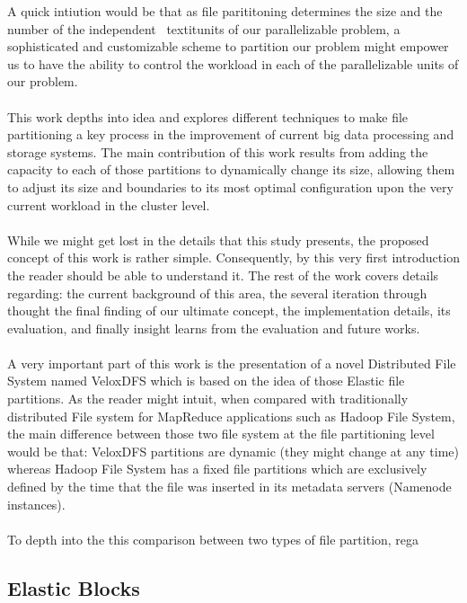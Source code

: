 A quick intiution would be that as file
parititoning determines the size and the number of the independent \
textit{units} of our parallelizable problem, a sophisticated and customizable scheme 
to partition our problem might empower us to have the ability to control the
workload in each of the parallelizable units of our problem. \\ \\

This work depths into idea and explores different techniques to make
file partitioning a key process in the improvement of current big data
processing and storage systems. The main contribution of this work results from
adding the capacity to each of those partitions to dynamically change its size,
allowing them to adjust its size and boundaries to its most optimal
configuration upon the very current workload in the cluster level.  \\ \\

While we might get lost in the details that this study presents, the proposed
concept of this work is rather simple. Consequently, by this very first
introduction the reader should be able to understand it. The rest of the work
covers details regarding: the current background of this area, the several
iteration through thought the final finding of our ultimate concept, the
implementation details, its evaluation, and finally insight learns from the
evaluation and future works.  \\ \\

A very important part of this work is the presentation of a novel Distributed
File System named VeloxDFS which is based on the idea of those Elastic file
partitions. As the reader might intuit, when compared with traditionally
distributed File system for MapReduce applications such as Hadoop File System,
the main difference between those two file system at the file partitioning level
would be that: VeloxDFS partitions are dynamic (they might change at any time)
whereas Hadoop File System has a fixed file partitions which are exclusively
defined by the time that the file was inserted in its metadata servers (Namenode
instances).  \\ \\

To depth into the this comparison between two types of file partition, rega
\lipsum[20]

\subsection{Elastic Blocks}

